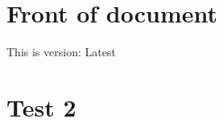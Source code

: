 \documentclass[a4paper]{article}
\newcommand{\YourVersion}{Latest}
\newcommand{\YourVersion}{\PipelineBuildVersion}
\begin{document}
\section{Front of document}
This is version: \YourVersion

\newpage
\section{Test 2}
\blindtext
\end{document}
